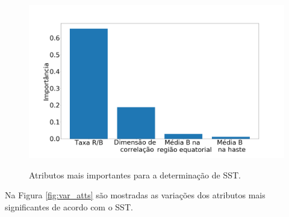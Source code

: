 \begin{figure}[H]
\centering
	\caption{Atributos mais importantes para a determinação de SST.}
	\includegraphics[scale=0.18]{img/feat_import_sst_palmer.png}
	\label{fig:feat_import}
\end{figure}

Na Figura \ref{fig:var_atts} são mostradas as variações dos atributos mais significantes de acordo com o SST.

